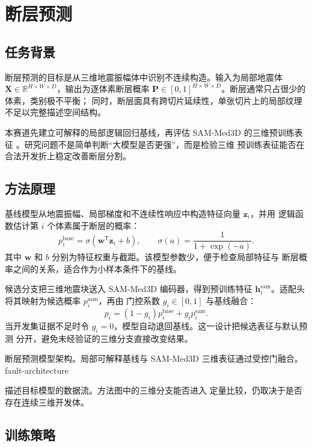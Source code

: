 \chapter{断层预测}

\section{任务背景}

断层预测的目标是从三维地震振幅体中识别不连续构造。输入为局部地震体
$\bm{X}\in\mathbb{R}^{H\times W\times D}$，输出为逐体素断层概率
$\bm{P}\in[0,1]^{H\times W\times D}$。断层通常只占很少的体素，类别极不平衡；
同时，断层面具有跨切片延续性，单张切片上的局部纹理不足以完整描述空间结构。

本赛道先建立可解释的局部逻辑回归基线，再评估 SAM-Med3D 的三维预训练表征
\cite{wang2023sammed3d}。研究问题不是简单判断“大模型是否更强”，而是检验三维
预训练表征能否在合法开发折上稳定改善断层分割。

\section{方法原理}

基线模型从地震振幅、局部梯度和不连续性响应中构造特征向量 $\bm{z}_i$，并用
逻辑函数估计第 $i$ 个体素属于断层的概率：
\begin{equation}
  p_i^{\mathrm{base}}=\sigma(\bm{w}^{\mathsf T}\bm{z}_i+b),
  \qquad
  \sigma(a)=\frac{1}{1+\exp(-a)} .
\end{equation}
其中 $\bm{w}$ 和 $b$ 分别为特征权重与截距。该模型参数少，便于检查局部特征与
断层概率之间的关系，适合作为小样本条件下的基线。

候选分支把三维地震块送入 SAM-Med3D 编码器，得到预训练特征
$\bm{h}_i^{\mathrm{sam}}$。适配头将其映射为候选概率 $p_i^{\mathrm{sam}}$，再由
门控系数 $g_i\in[0,1]$ 与基线融合：
\begin{equation}
  p_i=(1-g_i)p_i^{\mathrm{base}}+g_i p_i^{\mathrm{sam}} .
\end{equation}
当开发集证据不足时令 $g_i=0$，模型自动退回基线。这一设计把候选表征与默认预测
分开，避免未经验证的三维分支直接改变结果。

  {断层预测模型架构。局部可解释基线与 SAM-Med3D 三维表征通过受控门融合。}
  {fault-architecture}

描述目标模型的数据流。方法图中的三维分支能否进入
定量比较，仍取决于是否存在连续三维开发体。

\section{训练策略}

